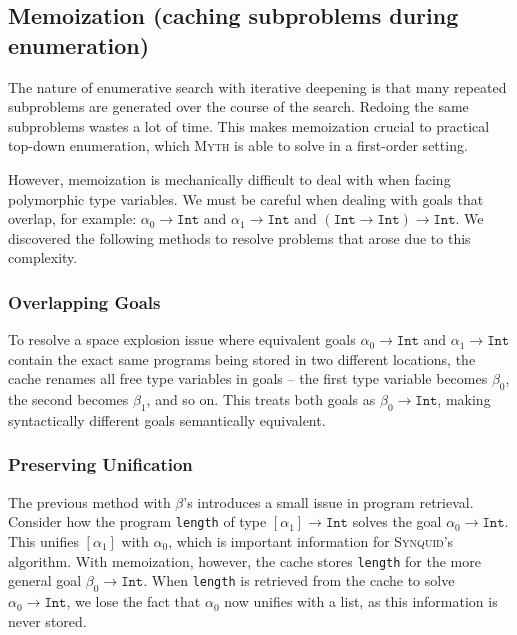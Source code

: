 \documentclass[acmsmall,nonacm]{acmart}
\begin{document}
\subsection{Memoization (caching subproblems during enumeration)}

The nature of enumerative search with iterative deepening is that many
repeated subproblems are generated over the course of the search.
Redoing the same subproblems wastes a lot of time.
This makes memoization crucial to practical 
top-down enumeration, which \textsc{Myth} \cite{myth} is able to solve in a 
first-order setting.

However, memoization is mechanically difficult to deal with
when facing polymorphic type variables.
We must be careful when dealing with goals that overlap, for example:
$\alpha_0 \to \texttt{Int}$ and $\alpha_1 \to \texttt{Int}$ and
$(\texttt{Int} \to \texttt{Int}) \to \texttt{Int}$.
We discovered the following methods to resolve problems that arose due
to this complexity.

\subsubsection{Overlapping Goals}

To resolve a space explosion issue where equivalent goals
$\alpha_0 \to \texttt{Int}$ and $\alpha_1 \to \texttt{Int}$
contain the exact same programs being stored in two different locations,
the cache renames all free type variables in goals --
the first type variable becomes $\beta_0$,
the second becomes $\beta_1$, and so on.
This treats both goals as $\beta_0 \to \texttt{Int}$,
making syntactically different goals semantically equivalent.
  
\subsubsection{Preserving Unification}
The previous method with $\beta$'s introduces a small issue in program
retrieval. Consider how the program \texttt{length} of type $[\alpha_1] \to
\texttt{Int}$ solves the goal $\alpha_0 \to \texttt{Int}$. This unifies
$[\alpha_1]$ with $\alpha_0$, which is important information for
\textsc{Synquid}'s algorithm. With memoization, however, the cache stores
\texttt{length} for the more general goal $\beta_0 \to \texttt{Int}$. When
\texttt{length} is retrieved from the cache to solve $\alpha_0 \to
\texttt{Int}$, we lose the fact that $\alpha_0$ now unifies with a list, as
this information is never stored.
\end{document}
